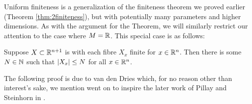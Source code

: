 Uniform finiteness is a generalization of the finiteness theorem we proved earlier (Theorem \ref{thm:2finiteness}), but with potentially many parameters and higher dimensions. As with the argument for the \CD Theorem, we will similarly restrict our attention to the case where $M = \mathbb{R}$. This special case is as follows:

\begin{proposition}
  \label{prop:unif-finiteness}
  Suppose $X \subset \mathbb{R}^{n+1}$ is  with each fibre $X_x$ finite for $x \in \mathbb{R}^n$. Then there is some $N \in \mathbb{N}$ such that $\vert X_x\vert \leq N$ for all $x \in \mathbb{R}^n$.
\end{proposition}


The following proof is due to van den Dries \cite{dries_remarks_1984} which, for no reason other than interest's sake, we mention went on to inspire the later work of Pillay and Steinhorn in \cite{pillay_definable_1986}.

